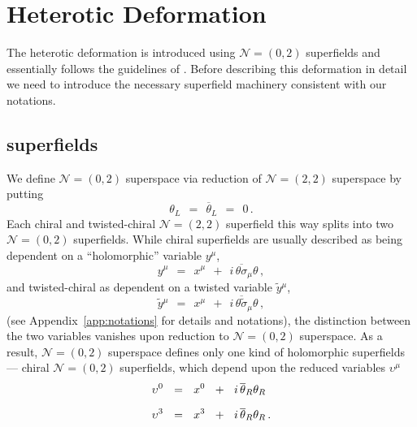 \documentclass[epsfig,12pt]{article}
\def\beq{\begin{equation}}
\def\eeq{\end{equation}}
\newcommand{\ntwot}{${\mathcal N}= \left(2,2\right) $ }
\newcommand{\ntwoo}{${\mathcal N}= \left(0,2\right) $ }
\newcommand{\wt}{\widetilde}
\newcommand{\ov}{\overline}
\begin{document}
\section{Heterotic Deformation}
\label{shet}

	The heterotic deformation is introduced using \ntwoo superfields and
	essentially follows the guidelines of \cite{EdTo}.
	Before describing this deformation in detail we need to introduce the necessary
	superfield machinery consistent with our notations.


\subsection{\boldmath{\ntwoo} superfields}

	We define \ntwoo superspace via reduction of \ntwot superspace by putting
\beq
	\theta_L    ~~=~~    \ov\theta{}_L    ~~=~~    0\,.
\eeq
	Each chiral and twisted-chiral \ntwot superfield this way splits into two \ntwoo superfields.
	While chiral superfields are usually described as being dependent on
	a ``holomorphic'' variable $ y^\mu $,
\beq
	y^\mu    ~~=~~    x^\mu    ~~+~~    i\,\ov{\theta\sigma}{}_\mu\theta\,,
\eeq
	and twisted-chiral as dependent on a twisted variable $ \wt y{}^\mu $,
\beq
	\wt y{}^\mu    ~~=~~    x^\mu    ~~+~~    i\,\ov{\theta\wt\sigma}{}_\mu\theta\,,
\eeq
	(see Appendix~\ref{app:notations} for details and notations), 
	the distinction between the two variables vanishes upon reduction to \ntwoo superspace.
	As a result, \ntwoo superspace defines only one kind of holomorphic superfields --- 
	chiral \ntwoo superfields, which depend upon the reduced variables $ \upsilon^\mu $
\begin{align}
%
\notag
	\upsilon^0 &    ~~=~~    x^0  ~~+~~  i\,\ov\theta{}_R\theta_R
	\\[2mm]
%
	\upsilon^3 &    ~~=~~    x^3  ~~+~~  i\,\ov\theta{}_R\theta_R\,.
\end{align}
\end{document}
